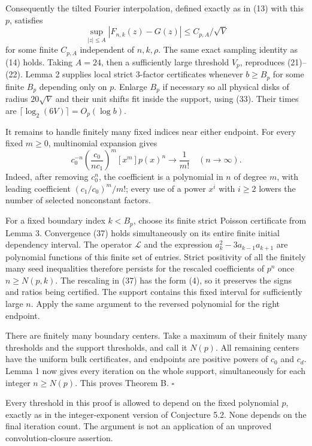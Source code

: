 \documentclass[11pt,a4paper]{article}
\begin{document}
Consequently the tilted Fourier interpolation, defined exactly as in
(13) with this \(p\), satisfies \[
 \sup_{|z|\leq A}|F_{n,k}(z)-G(z)|\leq C_{p,A}/\sqrt V \tag{36}
\] for some finite \(C_{p,A}\) independent of \(n,k,\rho\). The same
exact sampling identity as (14) holds. Taking \(A=24\), then a
sufficiently large threshold \(V_p\), reproduces (21)--(22). Lemma 2
supplies local strict 3-factor certificates whenever \(b\geq B_p\) for
some finite \(B_p\) depending only on \(p\). Enlarge \(B_p\) if
necessary so all physical disks of radius \(20\sqrt V\) and their unit
shifts fit inside the support, using (33). Their times are
\(\lceil\log_2(6V)\rceil=O_p(\log b)\).

It remains to handle finitely many fixed indices near either endpoint.
For every fixed \(m\geq0\), multinomial expansion gives \[
 c_0^{-n}\left(\frac{c_0}{nc_1}\right)^m[x^m]p(x)^n
 \longrightarrow\frac1{m!}\quad(n\to\infty). \tag{37}
\] Indeed, after removing \(c_0^n\), the coefficient is a polynomial in
\(n\) of degree \(m\), with leading coefficient \((c_1/c_0)^m/m!\);
every use of a power \(x^i\) with \(i\geq2\) lowers the number of
selected nonconstant factors.

For a fixed boundary index \(k<B_p\), choose its finite strict Poisson
certificate from Lemma 3. Convergence (37) holds simultaneously on its
entire finite initial dependency interval. The operator \(\mathcal L\)
and the expression \(a_k^2-3a_{k-1}a_{k+1}\) are polynomial functions of
this finite set of entries. Strict positivity of all the finitely many
seed inequalities therefore persists for the rescaled coefficients of
\(p^n\) once \(n\geq N(p,k)\). The rescaling in (37) has the form (4),
so it preserves the signs and ratios being certified. The support
contains this fixed interval for sufficiently large \(n\). Apply the
same argument to the reversed polynomial for the right endpoint.

There are finitely many boundary centers. Take a maximum of their
finitely many thresholds and the support thresholds, and call it
\(N(p)\). All remaining centers have the uniform bulk certificates, and
endpoints are positive powers of \(c_0\) and \(c_d\). Lemma 1 now gives
every iteration on the whole support, simultaneously for each integer
\(n\geq N(p)\). This proves Theorem B. \(\square\)

Every threshold in this proof is allowed to depend on the fixed
polynomial \(p\), exactly as in the integer-exponent version of
Conjecture 5.2. None depends on the final iteration count. The argument
is not an application of an unproved convolution-closure assertion.
\end{document}
